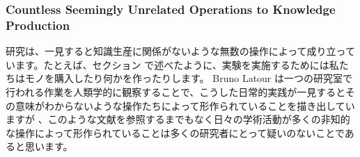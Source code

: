 



\subsubsection{Countless Seemingly Unrelated Operations to Knowledge Production}
\label{section-countless-seemingly-unrelated-operations-to-knowledge-production}

研究は、一見すると知識生産に関係がないような無数の操作によって成り立っています。たとえば、セクション \label{section-experimentation} で述べたように、実験を実施するためには私たちはモノを購入したり何かを作ったりします。 Bruno Latour は一つの研究室で行われる作業を人類学的に観察することで、こうした日常的実践が一見するとその意味がわからないような操作たちによって形作られていることを描き出していますが \cite{latour1987science}、このような文献を参照するまでもなく日々の学術活動が多くの非知的な操作によって形作られていることは多くの研究者にとって疑いのないことであると思います。

